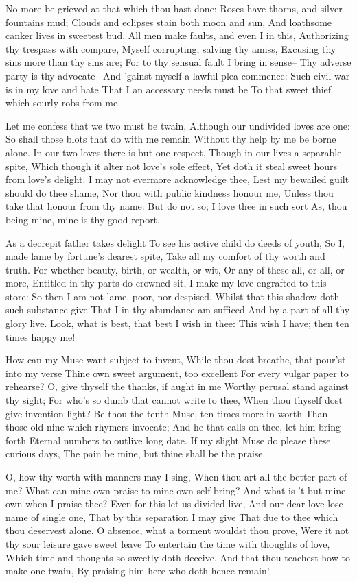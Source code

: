 \documentclass[twocolumn]{book}
\begin{document}
No more be grieved at that which thou hast done:
Roses have thorns, and silver fountains mud;
Clouds and eclipses stain both moon and sun,
And loathsome canker lives in sweetest bud.
All men make faults, and even I in this,
Authorizing thy trespass with compare,
Myself corrupting, salving thy amiss,
Excusing thy sins more than thy sins are;
For to thy sensual fault I bring in sense--
Thy adverse party is thy advocate--
And 'gainst myself a lawful plea commence:
Such civil war is in my love and hate
  That I an accessary needs must be
  To that sweet thief which sourly robs from me.


Let me confess that we two must be twain,
Although our undivided loves are one:
So shall those blots that do with me remain
Without thy help by me be borne alone.
In our two loves there is but one respect,
Though in our lives a separable spite,
Which though it alter not love's sole effect,
Yet doth it steal sweet hours from love's delight.
I may not evermore acknowledge thee,
Lest my bewailed guilt should do thee shame,
Nor thou with public kindness honour me,
Unless thou take that honour from thy name:
  But do not so; I love thee in such sort
  As, thou being mine, mine is thy good report.


As a decrepit father takes delight
To see his active child do deeds of youth,
So I, made lame by fortune's dearest spite,
Take all my comfort of thy worth and truth.
For whether beauty, birth, or wealth, or wit,
Or any of these all, or all, or more,
Entitled in thy parts do crowned sit,
I make my love engrafted to this store:
So then I am not lame, poor, nor despised,
Whilst that this shadow doth such substance give
That I in thy abundance am sufficed
And by a part of all thy glory live.
  Look, what is best, that best I wish in thee:
  This wish I have; then ten times happy me!


How can my Muse want subject to invent,
While thou dost breathe, that pour'st into my verse
Thine own sweet argument, too excellent
For every vulgar paper to rehearse?
O, give thyself the thanks, if aught in me
Worthy perusal stand against thy sight;
For who's so dumb that cannot write to thee,
When thou thyself dost give invention light?
Be thou the tenth Muse, ten times more in worth
Than those old nine which rhymers invocate;
And he that calls on thee, let him bring forth
Eternal numbers to outlive long date.
  If my slight Muse do please these curious days,
  The pain be mine, but thine shall be the praise.


O, how thy worth with manners may I sing,
When thou art all the better part of me?
What can mine own praise to mine own self bring?
And what is 't but mine own when I praise thee?
Even for this let us divided live,
And our dear love lose name of single one,
That by this separation I may give
That due to thee which thou deservest alone.
O absence, what a torment wouldst thou prove,
Were it not thy sour leisure gave sweet leave
To entertain the time with thoughts of love,
Which time and thoughts so sweetly doth deceive,
  And that thou teachest how to make one twain,
  By praising him here who doth hence remain!
\end{document}
